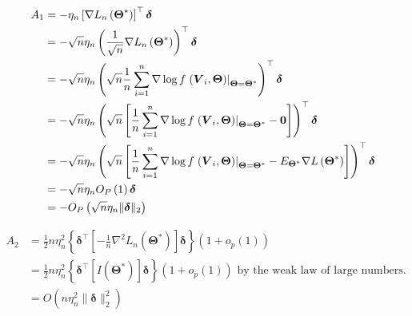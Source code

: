\documentclass[12pt,letter]{article}\usepackage[]{graphicx}\usepackage[]{color}
\newcommand{\bdelta}{\boldsymbol{\delta}}
\begin{document}
\begin{align}
A_{1} & =-\eta_{n}\left[\nabla L_{n}\left(\boldsymbol{\Theta}^{*}\right)\right]^{\top}\boldsymbol{\delta} \nonumber\\
& =-\sqrt{n}\eta_{n}\left(\frac{1}{\sqrt{n}}\nabla L_{n}\left(\boldsymbol{\Theta}^{*}\right)\right)^{\top}\boldsymbol{\delta} \nonumber\\
& =-\sqrt{n}\eta_{n}\left(\sqrt{n}\frac{1}{n}\sum_{i=1}^{n}\nabla\log f\left.\left(\boldsymbol{V}_{i},\boldsymbol{\Theta}\right)\right|_{\boldsymbol{\Theta}=\boldsymbol{\Theta}^{*}}\right)^{\top}\boldsymbol{\delta}\nonumber\\
& =-\sqrt{n}\eta_{n}\left(\sqrt{n}\left[\frac{1}{n}\sum_{i=1}^{n}\nabla\log f\left.\left(\boldsymbol{V}_{i},\boldsymbol{\Theta}\right)\right|_{\boldsymbol{\Theta}=\boldsymbol{\Theta}^{*}}-\mathbf{0}\right]\right)^{\top}\boldsymbol{\delta} \nonumber\\
& =-\sqrt{n}\eta_{n}\left(\sqrt{n}\left[\frac{1}{n}\sum_{i=1}^{n}\nabla\log f\left.\left(\boldsymbol{V}_{i},\boldsymbol{\Theta}\right)\right|_{\boldsymbol{\Theta}=\boldsymbol{\Theta}^{*}}-E_{\boldsymbol{\Theta}^{*}}\nabla L\left(\boldsymbol{\Theta}^{*}\right)\right]\right)^{\top}\boldsymbol{\delta} \nonumber\\
& =-\sqrt{n}\eta_{n}\Op\left(1\right)\boldsymbol{\delta}\nonumber\\
& =-\Op\left(\sqrt{n}\eta_{n} \|\bdelta\|_2 \right) \label{eq:lemma1A1}
\end{align}

\begin{align}
A_{2} & =\frac{1}{2}n\eta_{n}^{2}\left\{ \boldsymbol{\delta}^{\top}\left[-\frac{1}{n}\nabla^{2}L_{n}\left(\boldsymbol{\Theta}^{*}\right)\right]\boldsymbol{\delta}\right\} \left(1+o_{p}(1)\right) \nonumber\\
& =\frac{1}{2}n\eta_{n}^{2}\left\{ \boldsymbol{\delta}^{\top}\left[I\left(\boldsymbol{\Theta}^{*}\right)\right]\boldsymbol{\delta}\right\} \left(1+o_{p}(1)\right)\text{ by the weak law of large numbers. } \nonumber\\
& = O(n \eta_n^2 \|\bdelta\|_2^2) \label{eq:lemma1A2}
\end{align}
\end{document}

